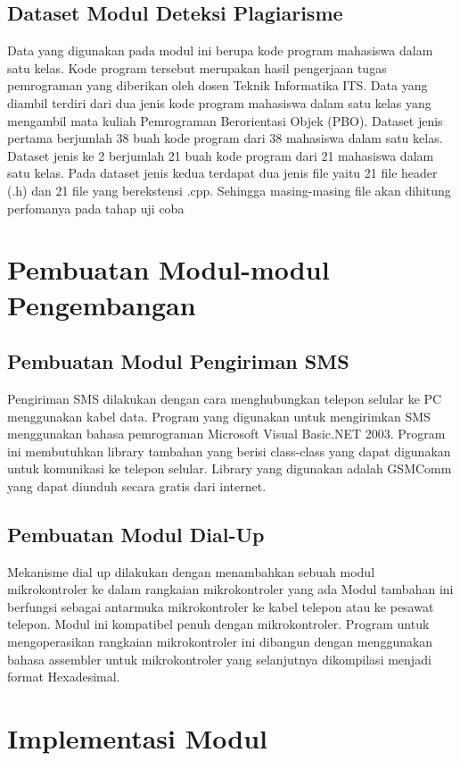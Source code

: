 \documentclass[12pt,a4paper]{article}
\begin{document}
\subsection{Dataset Modul Deteksi Plagiarisme}
Data yang digunakan pada modul ini berupa kode program mahasiswa dalam satu kelas. Kode program tersebut merupakan hasil pengerjaan tugas pemrograman yang diberikan oleh dosen Teknik Informatika ITS. Data yang diambil terdiri dari dua jenis kode program mahasiswa dalam satu kelas yang mengambil mata kuliah Pemrograman Berorientasi Objek (PBO). Dataset jenis pertama berjumlah 38 buah kode program dari 38 mahasiswa dalam satu kelas. Dataset jenis ke 2 berjumlah 21 buah kode program dari 21 mahasiswa dalam satu kelas. Pada dataset jenis kedua terdapat dua jenis file yaitu 21 file header (.h) dan 21 file yang berekstensi .cpp. Sehingga masing-masing file akan dihitung perfomanya pada tahap uji coba


\section{Pembuatan Modul-modul Pengembangan}
\subsection{Pembuatan Modul Pengiriman SMS}
Pengiriman SMS dilakukan dengan cara menghubungkan telepon selular ke PC menggunakan kabel data. 
Program yang digunakan untuk mengirimkan SMS menggunakan bahasa pemrograman Microsoft Visual Basic.NET 2003. Program ini membutuhkan library tambahan yang berisi class-class yang dapat digunakan untuk komunikasi ke telepon selular. Library yang digunakan adalah GSMComm yang dapat diunduh secara gratis dari internet. 
\subsection{Pembuatan Modul Dial-Up}
Mekanisme dial up dilakukan dengan menambahkan sebuah modul mikrokontroler ke dalam rangkaian mikrokontroler yang ada
Modul tambahan ini berfungsi sebagai antarmuka mikrokontroler ke kabel telepon atau ke pesawat telepon. Modul ini kompatibel penuh dengan mikrokontroler. 
Program untuk mengoperasikan rangkaian mikrokontroler ini dibangun dengan menggunakan bahasa assembler untuk mikrokontroler yang selanjutnya dikompilasi menjadi format Hexadesimal.


\section{Implementasi Modul}
\end{document}

